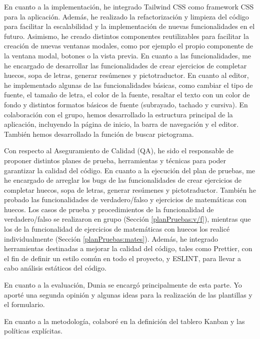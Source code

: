 En cuanto a la implementación, he integrado Tailwind CSS como framework CSS para la aplicación. Además, he realizado la refactorización y limpieza del código para facilitar la escalabilidad y la implementación de nuevas funcionalidades en el futuro. Asimismo, he creado distintos componentes reutilizables para facilitar la creación de nuevas ventanas modales, como por ejemplo el propio componente de la ventana modal, botones o la vista previa. En cuanto a las funcionalidades, me he encargado de desarrollar las funcionalidades de crear ejercicios de completar huecos, sopa de letras, generar resúmenes y pictotraductor. En cuanto al editor, he implementado algunas de las funcionalidades básicas, como cambiar el tipo de fuente, el tamaño de letra, el color de la fuente, resaltar el texto con un color de fondo y distintos formatos básicos de fuente (subrayado, tachado y cursiva). En colaboración con el grupo, hemos desarrollado la estructura principal de la aplicación, incluyendo la página de inicio, la barra de navegación y el editor. También hemos desarrollado la función de buscar pictograma.

Con respecto al Aseguramiento de Calidad (QA), he sido el responsable de proponer distintos planes de prueba, herramientas y técnicas para poder garantizar la calidad del código. En cuanto a la ejecución del plan de pruebas, me he encargado de arreglar los bugs de las funcionalidades de crear ejercicios de completar huecos, sopa de letras, generar resúmenes y pictotraductor. También he probado las funcionalidades de verdadero/falso y ejercicios de matemáticas con huecos. Los casos de prueba y procedimientos de la funcionalidad de verdadero/falso se realizaron en grupo (Sección \ref{planPruebas:v/f}), mientras que los de la funcionalidad de ejercicios de matemáticas con huecos los realicé individualmente (Sección \ref{planPruebas:mates}). Además, he integrado herramientas destinadas a mejorar la calidad del código, tales como Prettier, con el fin de definir un estilo común en todo el proyecto, y ESLINT, para llevar a cabo análisis estáticos del código.

En cuanto a la evaluación, Dunia se encargó principalmente de esta parte. Yo aporté una segunda opinión y algunas ideas para la realización de las plantillas y el formulario.

En cuanto a la metodología, colaboré en la definición del tablero Kanban y las políticas explícitas.

